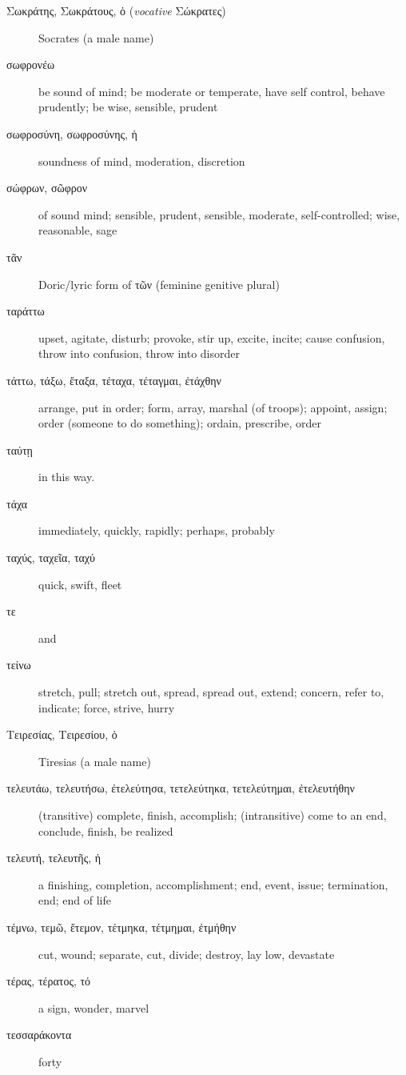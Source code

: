 \documentclass[12pt,letterpaper]{article}
\begin{document}
\begin{description}
    \item[\textgreek{Σωκράτης, Σωκράτους, ὁ (\textit{vocative} Σώκρατες)}] Socrates (a male name)
    \item[\textgreek{σωφρονέω}] be sound of mind; be moderate or temperate, have self control, behave prudently; be wise, sensible, prudent
    \item[\textgreek{σωφροσύνη, σωφροσύνης, ἡ}] soundness of mind, moderation, discretion
    \item[\textgreek{σώφρων, σῶφρον}] of sound mind; sensible, prudent, sensible, moderate, self-controlled; wise, reasonable, sage
    \item[\textgreek{τᾶν}] Doric/lyric form of τῶν (feminine genitive plural)
    \item[\textgreek{ταράττω}] upset, agitate, disturb; provoke, stir up, excite, incite; cause confusion, throw into confusion, throw into disorder
    \item[\textgreek{τάττω, τάξω, ἔταξα, τέταχα, τέταγμαι, ἐτάχθην}] \marginnote{*}arrange, put in order; form, array, marshal (of troops); appoint, assign; order (someone to do something); ordain, prescribe, order
    \item[\textgreek{ταύτῃ}] in this way.
    \item[\textgreek{τάχα}] immediately, quickly, rapidly; perhaps, probably
    \item[\textgreek{ταχύς, ταχεῖα, ταχύ}] \marginnote{*}quick, swift, fleet
    \item[\textgreek{τε}] \marginnote{*}and
    \item[\textgreek{τείνω}] stretch, pull; stretch out, spread, spread out, extend; concern, refer to, indicate; force, strive, hurry
    \item[\textgreek{Τειρεσίας, Τειρεσίου, ὁ}] Tiresias (a male name)
    \item[\textgreek{τελευτάω, τελευτήσω, ἐτελεύτησα, τετελεύτηκα, τετελεύτημαι, ἐτελευτήθην}] \marginnote{*}(transitive) complete, finish, accomplish; (intransitive) come to an end, conclude, finish, be realized
    \item[\textgreek{τελευτή, τελευτῆς, ἡ}] a finishing, completion, accomplishment; end, event, issue; termination, end; end of life
    \item[\textgreek{τέμνω, τεμῶ, ἔτεμον, τέτμηκα, τέτμημαι, ἐτμήθην}] \marginnote{*}cut, wound; separate, cut, divide; destroy, lay low, devastate
    \item[\textgreek{τέρας, τέρατος, τό}] a sign, wonder, marvel
    \item[\textgreek{τεσσαράκοντα}] forty

\end{description}
\end{document}
